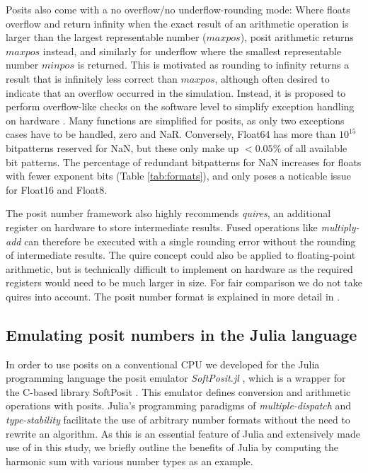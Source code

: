 \documentclass[draft]{agujournal2019}
\begin{document}
Posits also come with a no overflow/no underflow-rounding mode: Where floats overflow and return infinity when the exact result of an arithmetic operation is larger than the largest representable number ($maxpos$), posit arithmetic returns $maxpos$ instead, and similarly for underflow where the smallest representable number $minpos$ is returned. This is motivated as rounding to infinity returns a result that is infinitely less correct than $maxpos$, although often desired to indicate that an overflow occurred in the simulation. Instead, it is proposed to perform overflow-like checks on the software level to simplify exception handling on hardware \cite{Gustafson2017b}. Many functions are simplified for posits, as only two exceptions cases have to be handled, zero and NaR. Conversely, Float64 has more than $10^{15}$ bitpatterns reserved for NaN, but these only make up $< 0.05\%$ of all available bit patterns. The percentage of redundant bitpatterns for NaN increases for floats with fewer exponent bits (Table \ref{tab:formats}), and only poses a noticable issue for Float16 and Float8.

The posit number framework also highly recommends \emph{quires}, an additional register on hardware to store intermediate results. Fused operations like \emph{multiply-add} can therefore be executed with a single rounding error without the rounding of intermediate results. The quire concept could also be applied to floating-point arithmetic, but is technically difficult to implement on hardware as the required registers would need to be much larger in size. For fair comparison we do not take quires into account. The posit number format is explained in more detail in .

\subsection{Emulating posit numbers in the Julia language}
\label{sec:Julia}

In order to use posits on a conventional CPU we developed for the Julia programming language \cite{Bezanson2017} the posit emulator \emph{SoftPosit.jl} \cite{Kloewer2019}, which is a wrapper for the C-based library SoftPosit \cite{Heung2019}. This emulator defines conversion and arithmetic operations with posits. Julia's programming paradigms of \emph{multiple-dispatch} and \emph{type-stability} facilitate the use of arbitrary number formats without the need to rewrite an algorithm. As this is an essential feature of Julia and extensively made use of in this study, we briefly outline the benefits of Julia by computing the harmonic sum with various number types as an example.
\end{document}
